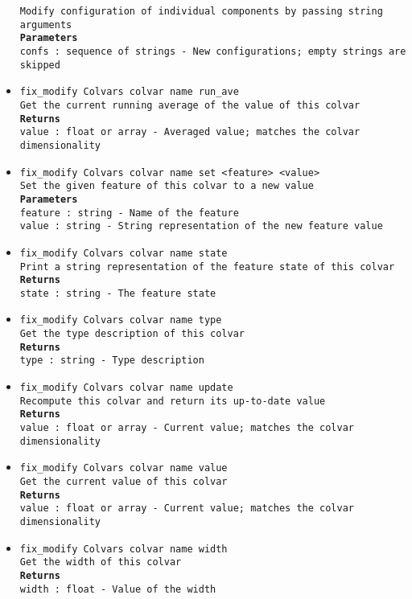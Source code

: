 \begin{itemize}
\texttt{Modify configuration of individual components by passing string arguments}
\\
\texttt{\textbf{Parameters}}
\\
\texttt{confs : sequence of strings - New configurations; empty strings are skipped}
\item \texttt{fix\_modify Colvars colvar name run\_ave}
\\
\texttt{Get the current running average of the value of this colvar}
\\
\texttt{\textbf{Returns}}
\\
\texttt{value : float or array - Averaged value; matches the colvar dimensionality}
\item \texttt{fix\_modify Colvars colvar name set <feature> <value>}
\\
\texttt{Set the given feature of this colvar to a new value}
\\
\texttt{\textbf{Parameters}}
\\
\texttt{feature : string - Name of the feature}
\\
\texttt{value : string - String representation of the new feature value}
\item \texttt{fix\_modify Colvars colvar name state}
\\
\texttt{Print a string representation of the feature state of this colvar}
\\
\texttt{\textbf{Returns}}
\\
\texttt{state : string - The feature state}
\item \texttt{fix\_modify Colvars colvar name type}
\\
\texttt{Get the type description of this colvar}
\\
\texttt{\textbf{Returns}}
\\
\texttt{type : string - Type description}
\item \texttt{fix\_modify Colvars colvar name update}
\\
\texttt{Recompute this colvar and return its up-to-date value}
\\
\texttt{\textbf{Returns}}
\\
\texttt{value : float or array - Current value; matches the colvar dimensionality}
\item \texttt{fix\_modify Colvars colvar name value}
\\
\texttt{Get the current value of this colvar}
\\
\texttt{\textbf{Returns}}
\\
\texttt{value : float or array - Current value; matches the colvar dimensionality}
\item \texttt{fix\_modify Colvars colvar name width}
\\
\texttt{Get the width of this colvar}
\\
\texttt{\textbf{Returns}}
\\
\texttt{width : float - Value of the width}
\end{itemize}
